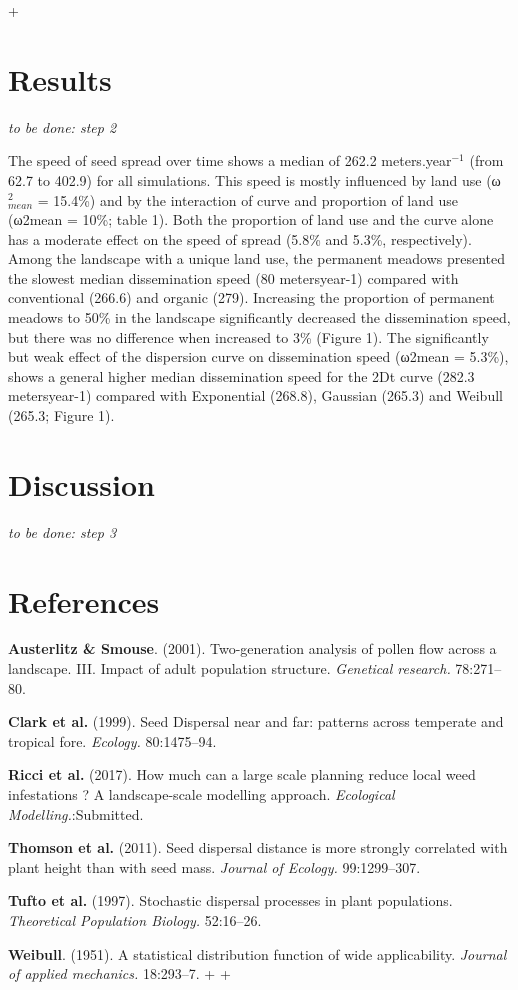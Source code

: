 +\documentclass[12pt]{article}
\begin{document}
\section{Results}\label{results}

\emph{to be done: step 2}

The speed of seed spread over time shows a median of 262.2
meters.year\(^{-1}\) (from 62.7 to 402.9) for all simulations. This
speed is mostly influenced by land use (ω\(^2_{mean}\) = 15.4\%) and by
the interaction of curve and proportion of land use (ω2mean = 10\%;
table 1). Both the proportion of land use and the curve alone has a
moderate effect on the speed of spread (5.8\% and 5.3\%, respectively).
Among the landscape with a unique land use, the permanent meadows
presented the slowest median dissemination speed (80 metersyear-1)
compared with conventional (266.6) and organic (279). Increasing the
proportion of permanent meadows to 50\% in the landscape significantly
decreased the dissemination speed, but there was no difference when
increased to 3\% (Figure 1). The significantly but weak effect of the
dispersion curve on dissemination speed (ω2mean = 5.3\%), shows a
general higher median dissemination speed for the 2Dt curve (282.3
metersyear-1) compared with Exponential (268.8), Gaussian (265.3) and
Weibull (265.3; Figure 1).

\section{Discussion}\label{discussion}

\emph{to be done: step 3}

\section*{References}\label{references}

\hypertarget{refs}{}
\hypertarget{ref-Austerlitz2001}{}
\textbf{Austerlitz \& Smouse}. (2001). Two-generation analysis of pollen
flow across a landscape. III. Impact of adult population structure.
\emph{Genetical research.} 78:271--80.

\hypertarget{ref-Clark1999}{}
\textbf{Clark et al.} (1999). Seed Dispersal near and far: patterns
across temperate and tropical fore. \emph{Ecology.} 80:1475--94.

\hypertarget{ref-Ricci2017}{}
\textbf{Ricci et al.} (2017). How much can a large scale planning reduce
local weed infestations ? A landscape-scale modelling approach.
\emph{Ecological Modelling.}:Submitted.

\hypertarget{ref-Thomson2011}{}
\textbf{Thomson et al.} (2011). Seed dispersal distance is more strongly
correlated with plant height than with seed mass. \emph{Journal of
Ecology.} 99:1299--307.

\hypertarget{ref-Tufto1997}{}
\textbf{Tufto et al.} (1997). Stochastic dispersal processes in plant
populations. \emph{Theoretical Population Biology.} 52:16--26.

\hypertarget{ref-Weibull1951}{}
\textbf{Weibull}. (1951). A statistical distribution function of wide
applicability. \emph{Journal of applied mechanics.} 18:293--7.
 +
 +
\end{document}
